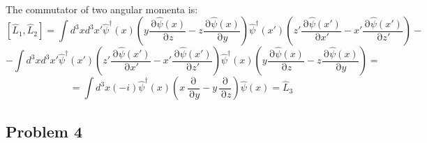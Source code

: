 \documentclass[12 pt]{article}
\DeclareMathOperator {\p} {\partial}
\begin{document}
\\
The commutator of two angular momenta is:
\[      [\hat L_1, \hat L_2 ] = \int d^3 x d^3 x'  \hat \psi^{\dagger} (x) \left(    y \frac{\p \hat \psi (x)}{\p z}   - z \frac{\p \hat \psi (x)}{\p y}          \right)             \hat \psi^{\dagger} (x') \left(    z' \frac{\p \hat \psi (x')}{\p x'}   - x' \frac{\p \hat \psi (x')}{\p z'}          \right)      -     \]
\[        -     \int d^3 x d^3 x'     \hat \psi^{\dagger} (x') \left(    z' \frac{\p \hat \psi (x')}{\p x'}   - x' \frac{\p \hat \psi (x')}{\p z'}          \right)   \hat \psi^{\dagger} (x) \left(    y \frac{\p \hat \psi (x)}{\p z}   - z \frac{\p \hat \psi (x)}{\p y}          \right)     =   \]
\[    =      \int d^3x (-i)  \hat \psi^{\dagger} (x) \left(   x \frac{\p}{\p y} - y \frac{\p}{\p z}   \right)\hat \psi (x)  = \hat L_3   \]



\subsection*{Problem 4}
\end{document}

